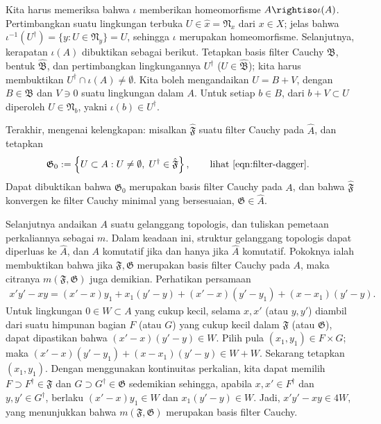 \begin{asparaenum}
	\item Kita harus memeriksa bahwa $\iota$ memberikan homeomorfisme $A \rightiso \iota(A)$. Pertimbangkan suatu lingkungan terbuka $U \in \hat{x} = \mathfrak{N}_x$ dari $x \in X$; jelas bahwa $\iota^{-1}(U^\dagger) = \{y: U \in \mathfrak{N}_y \} = U$, sehingga $\iota$ merupakan homeomorfisme. Selanjutnya, kerapatan $\iota(A)$ dibuktikan sebagai berikut. Tetapkan basis filter Cauchy $\mathfrak{B}$, bentuk $\hat{\mathfrak{B}}$, dan pertimbangkan lingkungannya $U^\dagger$ ($U \in \hat{\mathfrak{B}}$); kita harus membuktikan $U^\dagger \cap \iota(A) \neq \emptyset$. Kita boleh mengandaikan $U = B+V$, dengan $B \in \mathfrak{B}$ dan $V \ni 0$ suatu lingkungan dalam $A$. Untuk setiap $b \in B$, dari $b+V \subset U$ diperoleh $U \in \mathfrak{N}_b$, yakni $\iota(b) \in U^\dagger$.

	\item Terakhir, mengenai kelengkapan: misalkan $\hat{\mathfrak{F}}$ suatu filter Cauchy pada $\hat{A}$, dan tetapkan
	\[ \mathfrak{G}_0 := \left\{ U \subset A : U \neq \emptyset, \; U^\dagger \in \hat{\mathfrak{F}} \right\}, \qquad \text{lihat \eqref{eqn:filter-dagger}. } \]
	Dapat dibuktikan bahwa $\mathfrak{G}_0$ merupakan basis filter Cauchy pada $A$, dan bahwa $\hat{\mathfrak{F}}$ konvergen ke filter Cauchy minimal yang bersesuaian, $\mathfrak{G} \in \hat{A}$.
\end{asparaenum}

Selanjutnya andaikan $A$ suatu gelanggang topologis, dan tuliskan pemetaan perkaliannya sebagai $m$. Dalam keadaan ini, struktur gelanggang topologis dapat diperluas ke $\hat{A}$, dan $A$ komutatif jika dan hanya jika $\hat{A}$ komutatif. Pokoknya ialah membuktikan bahwa jika $\mathfrak{F}, \mathfrak{G}$ merupakan basis filter Cauchy pada $A$, maka citranya $m(\mathfrak{F}, \mathfrak{G})$ juga demikian. Perhatikan persamaan
\begin{gather*}
	x'y' - xy = (x'-x)y_1 + x_1 (y'-y) + (x' - x)(y' - y_1) + (x - x_1)(y'-y).
\end{gather*}
Untuk lingkungan $0 \in W \subset A$ yang cukup kecil, selama $x,x'$ (atau $y,y'$) diambil dari suatu himpunan bagian $F$ (atau $G$) yang cukup kecil dalam $\mathfrak{F}$ (atau $\mathfrak{G}$), dapat dipastikan bahwa $(x'-x)(y'-y) \in W$. Pilih pula $(x_1, y_1) \in F \times G$; maka $(x' - x)(y' - y_1) + (x - x_1)(y'-y) \in W + W$. Sekarang tetapkan $(x_1, y_1)$. Dengan menggunakan kontinuitas perkalian, kita dapat memilih $F \supset F^\dagger \in \mathfrak{F}$ dan $G \supset G^\dagger \in \mathfrak{G}$ sedemikian sehingga, apabila $x,x' \in F^\dagger$ dan $y,y' \in G^\dagger$, berlaku $(x'-x)y_1 \in W$ dan $x_1(y'-y) \in W$. Jadi, $x'y' - xy \in 4 W$, yang menunjukkan bahwa $m(\mathfrak{F}, \mathfrak{G})$ merupakan basis filter Cauchy.

